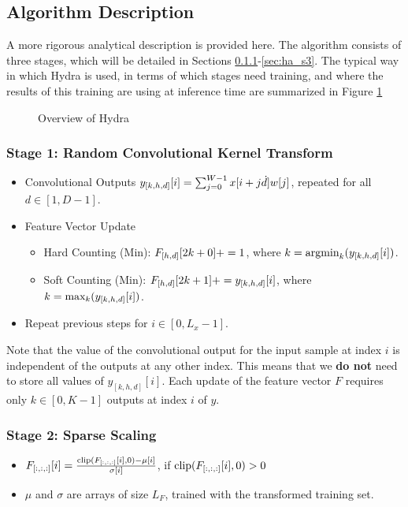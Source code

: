 \subsection{Algorithm Description}\label{sec:ha_algo_descr}
A more rigorous analytical description is provided here. The algorithm consists of three stages, which will be detailed in Sections \ref{sec:ha_s1}-\ref{sec:ha_s3}.
The typical way in which Hydra is used, in terms of which stages need training, and where the results of this training are using at inference time
are summarized in Figure \ref{fig:overview_hydra}
\begin{figure}[h!]

\caption{Overview of Hydra}
\label{fig:overview_hydra}
\end{figure}
\subsubsection{Stage 1: Random Convolutional Kernel Transform}\label{sec:ha_s1}

\begin{itemize}
    \item Convolutional Outputs $y\sb{[k,h,d]}[i] = \sum\sb{j=0}^{W-1} x[i+j\dot d] w[j]$, repeated for all $d \in [1,D-1]$.
    \item Feature Vector Update
        \begin{itemize}
            \item Hard Counting (Min): $F\sb{[h,d]}[2k+0] += 1$,              where $k = \text{argmin}\sb{k} (y\sb{[k,h,d]}[i])$.
            \item Soft Counting (Min): $F\sb{[h,d]}[2k+1] += y_{[k,h,d]}[i]$, where $k = \text{max}\sb{k} (y\sb{[k,h,d]}[i])$.
        \end{itemize}
    \item Repeat previous steps for $i \in [0, L_x-1]$. 
\end{itemize}
Note that the value of the convolutional output for the input sample at index $i$ is independent of the outputs at any other index.
This means that we \textbf{do not} need to store all values of $y_{[k,h,d]}[i]$. Each update of the feature vector $F$ requires only $k \in [0,K-1]$ outputs at index $i$ of $y$.

\subsubsection{Stage 2: Sparse Scaling}\label{sec:ha_s2}
\begin{itemize}
    \item $F\sb{[:,:,:]}[i] = \frac{\text{clip}(F\sb{[:,:,:]}[i],0) - \mu[i]}{\sigma[i]}$, if $\text{clip}(F\sb{[:,:,:]}[i],0) > 0$
    \item $\mu$ and $\sigma$ are arrays of size $L_F$, trained with the transformed training set.
\end{itemize}
